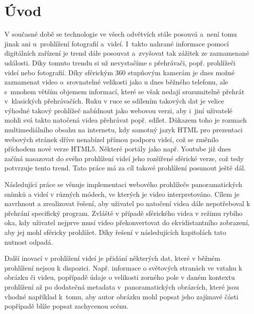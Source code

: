\setcounter{secnumdepth}{4} %



\chapter{Úvod}
\label{chapter:1}

V současné době se technologie ve všech odvětvích stále posouvá a~není tomu jinak ani u~prohlížení fotografií a~videí. I~takto nahrané informace pomocí digitálních zařízení je trend dále posouvat a~zvyšovat tak zážitek ze zaznamenané události. Díky tomuto trendu si už nevystačíme s  přehrávači, popř. prohlížeči videí nebo fotografií. Díky sférickým 360 stupňovým kamerám je dnes možné zaznamenat video o~srovnatelné velikosti jako u dnes běžného telefonu, ale s~mnohem větším objemem informací, které se však nedají srozumitelně přehrát v~klasických přehrávačích. Ruku v ruce se sdílením takových dat je velice výhodné takový prohlížeč nabídnout jako webovou verzi, aby i~jiní uživatelé mohli svá takto natočená videa přehrávat popř. sdílet. Důkazem toho je rozmach multimediálního obsahu na internetu, kdy samotný jazyk HTML pro prezentaci webových stránek dříve nenabízel přímou podporu videí, což se změnilo příchodem nové verze HTML5. Některé portály jako např. Youtube již dnes začíná nasazovat do svého prohlížení videí jeho rozšířené sférické verze, což tedy potvrzuje tento trend. Tato práce má za cíl takové prohlížení posunout ještě dál.


Následující práce se věnuje implementaci webového prohlížeče panoramatických snímků a videí v různých módech, ve kterých je video interpretováno. Cílem je  navrhnout a zrealizovat řešení, aby uživatel po natočení videa dále nepotřeboval k přehrání specifický program. Zvláště v případě  sférického videa v režimu rybího oka, kdy uživatel nejprve musí video překonvertovat do ekvidistantního zobrazení, aby jej mohl sféricky prohlížet. Díky řešení v následujících kapitolách tato nutnost odpadá. 


Další inovací v prohlížení videí je přidání některých dat, které v běžném prohlížení nejsou k dispozici. Např. informace o světových stranách ve vztahu k obrázku či videu, popřípadě údaje o velikosti zorného pole v daném kontextu prohlížení až po dodatečná metadata v~panoramatických obrázcích, které jsou vhodné například k~tomu, aby autor obrázku mohl popsat jeho zajímavé části popřípadě blíže popsat zachycenou scénu.
\newline

